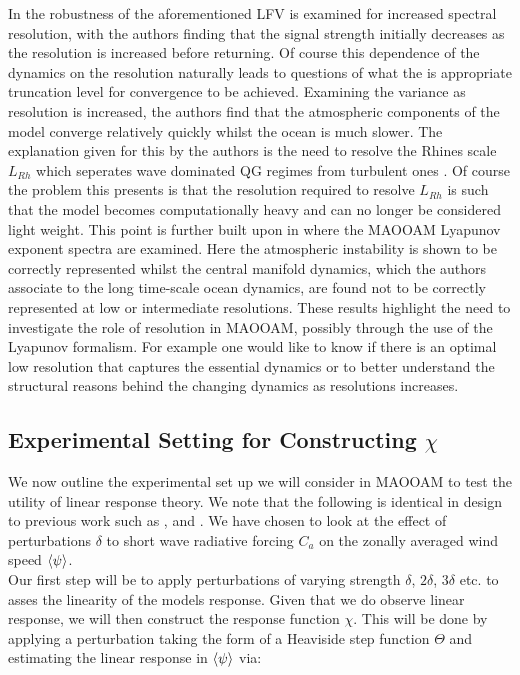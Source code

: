 \noindent In \cite{Cruz2016} the robustness of the aforementioned LFV is examined for increased spectral resolution, with the authors finding that the signal strength initially decreases as the resolution is increased before returning. Of course this dependence of the dynamics on the resolution naturally leads to questions of what the is appropriate truncation level for convergence to be achieved. Examining the variance as resolution is increased, the authors find that the atmospheric components of the model converge relatively quickly whilst the ocean is much slower. The explanation given for this by the authors is the need to resolve the Rhines scale $L_{Rh}$ which seperates wave dominated QG regimes from turbulent ones \cite{Vallis2017}. Of course the problem this presents is that the resolution required to resolve $L_{Rh}$ is such that the model becomes computationally heavy and can no longer be considered light weight. This point is further built upon in \cite{DeCruz2018} where the MAOOAM Lyapunov exponent spectra are examined. Here the atmospheric instability is shown to be correctly represented whilst the central manifold dynamics, which the authors associate to the long time-scale ocean dynamics, are found not to be correctly represented at low or intermediate resolutions. These results highlight the need to investigate the role of resolution in MAOOAM, possibly through the use of the Lyapunov formalism. For example one would like to know if there is an optimal low resolution that captures the essential dynamics or to better understand the structural reasons behind the changing dynamics as resolutions increases.

\subsection{Experimental Setting for Constructing $\chi$}

We now outline the experimental set up we will consider in MAOOAM to test the utility of linear response theory. We note that the following is identical in design to previous work such as \cite{Lucarini2017a}, \cite{Gritsun2017} and \cite{Lucarini2011}. We have chosen to look at the effect of perturbations $\delta$ to short wave radiative forcing $C_a$ on the zonally averaged wind speed $\expval{\psi}$.\\ 

\noindent Our first step will be to apply perturbations of varying strength $\delta$, $2\delta$, $3\delta$ etc. to asses the linearity of the models response. Given that we do observe linear response, we will then construct the response function $\chi$. This will be done by applying a perturbation taking the form of a Heaviside step function $\Theta$ and estimating the linear response in $\expval{\psi}$ via:

